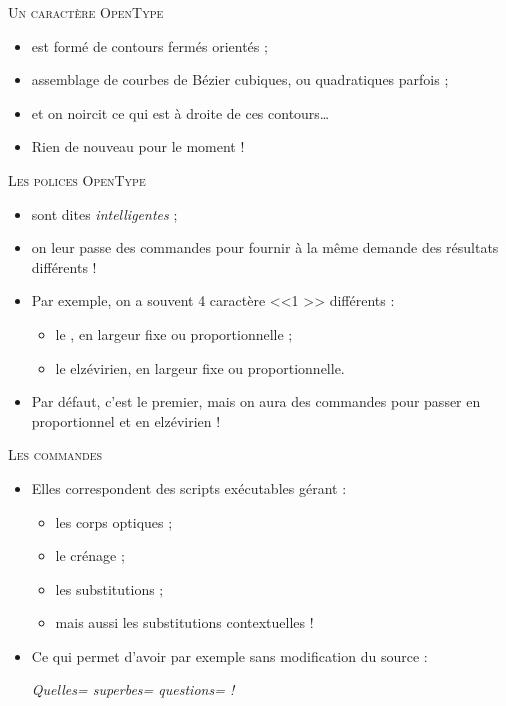 \documentclass[12pt,a4paper,twocolumn]{book} %
\def\ogla{{\fontfamily{fi4}\selectfont<<}}
\def\fgla{{\fontfamily{fi4}\selectfont>>}}
\begin{document}
{	{\textsc{Un caractère OpenType}}
		\begin{itemize}
			\item<+-> est formé de contours fermés orientés ;
			\item<+-> assemblage de courbes de Bézier cubiques, ou quadratiques parfois ;
			\item<+-> et on noircit ce qui est à droite de ces contours\dots
			\item<+-> Rien de nouveau pour le moment !
		\end{itemize}	
		
		
		
		
{\textsc{Les polices OpenType}}
		\begin{itemize}
			\item<+-> sont dites \textit{intelligentes} ;
			\item<+-> on leur passe des commandes pour fournir à la même demande des résultats différents !
			\item<+-> Par exemple, on a souvent 4 caractère \ogla 1 \fgla{} différents :
			\begin{itemize}
				\item<+-> le {}, en largeur fixe ou proportionnelle ;
				\item<+-> le {\selectfont {}} elzévirien, en largeur fixe ou proportionnelle.
			\end{itemize}
			\item<+-> Par défaut, c'est le premier, mais on aura des commandes pour passer en proportionnel et en elzévirien !
		\end{itemize}
		
				
		
		
		{\textsc{Les commandes}}
			\begin{itemize}
				\item<+->  Elles correspondent des scripts exécutables gérant :
				\begin{itemize}
					\item<+-> les corps optiques ;
					\item<+-> le crénage ;
					\item<+-> les substitutions ;
					\item<+-> mais aussi les substitutions contextuelles !
				\end{itemize}
				\item<+->  Ce qui permet d'avoir par exemple sans modification du source :
				
			
				{\selectfont\itshape
				Quelles= superbes= questions= !}
				

\end{itemize}}
\end{document}
